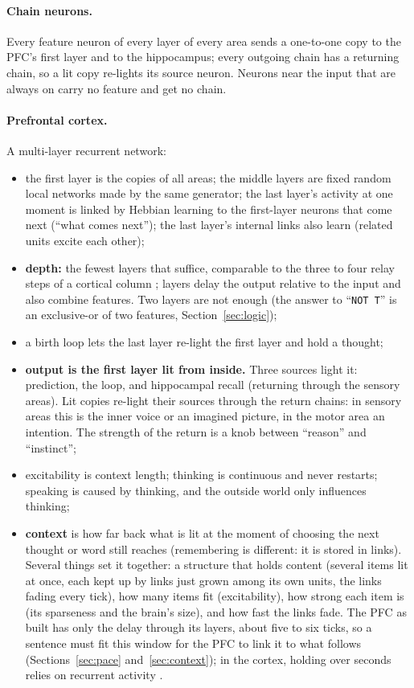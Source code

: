 \documentclass[11pt]{article}
\begin{document}
\paragraph{Chain neurons.} Every feature neuron of every layer of every area sends a one-to-one copy to the PFC's first
layer and to the hippocampus; every outgoing chain has a returning chain, so a lit copy re-lights its source neuron.
Neurons near the input that are always on carry no feature and get no chain.

\paragraph{Prefrontal cortex.} A multi-layer recurrent network:
\begin{itemize}
\item the first layer is the copies of all areas; the middle layers are fixed random local networks made by the same
generator; the last layer's activity at one moment is linked by Hebbian learning to the first-layer neurons that come
next (``what comes next''); the last layer's internal links also learn (related units excite each other);
\item \textbf{depth:} the fewest layers that suffice, comparable to the three to four relay steps of a cortical column
\cite{douglas_martin_2004}; layers delay the output relative to the input and also combine features. Two layers are not
enough (the answer to ``\texttt{NOT T}'' is an exclusive-or of two features, Section~\ref{sec:logic});
\item a birth loop lets the last layer re-light the first layer and hold a thought;
\item \textbf{output is the first layer lit from inside.} Three sources light it: prediction, the loop, and hippocampal
recall (returning through the sensory areas). Lit copies re-light their sources through the return chains: in sensory
areas this is the inner voice or an imagined picture, in the motor area an intention. The strength of the return is a
knob between ``reason'' and ``instinct'';
\item excitability is context length; thinking is continuous and never restarts; speaking is caused by thinking, and
the outside world only influences thinking;
\item \textbf{context} is how far back what is lit at the moment of choosing the next thought or word still reaches
(remembering is different: it is stored in links). Several things set it together: a structure that holds content
(several items lit at once, each kept up by links just grown among its own units, the links fading every tick), how many
items fit (excitability), how strong each item is (its sparseness and the brain's size), and how fast the links fade. The
PFC as built has only the delay through its layers, about five to six ticks, so a sentence must fit this window for the
PFC to link it to what follows (Sections~\ref{sec:pace} and~\ref{sec:context}); in the cortex, holding over seconds relies
on recurrent activity \cite{goldman_rakic_1995}.
\end{itemize}
\end{document}
